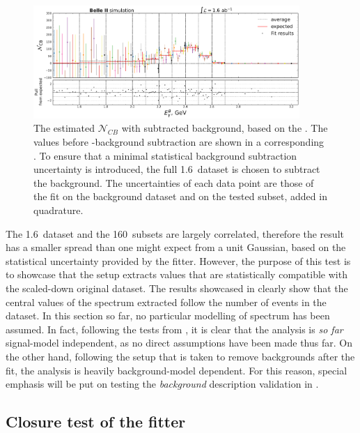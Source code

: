 \begin{figure}[htbp!]
    \includegraphics[width=0.9\textwidth]{figures/mc_validation/subtracted_signal_generic_mc.pdf}
    \caption{\label{fig:subtracted_validation_mc}
    The estimated $\mathcal{N}_{CB}$ with subtracted background, based on the .
    The values before \BB-background subtraction are shown in a corresponding .
    To ensure that a minimal statistical background subtraction uncertainty is introduced, the full 1.6~\invab dataset is chosen to subtract the background.
    The uncertainties of each data point are those of the \Mbc fit on the background dataset and on the tested subset, added in quadrature.
    }
\end{figure}

The 1.6~\invab dataset and the 160~\invfb subsets are largely correlated, therefore the result has a smaller spread than one might expect from a unit Gaussian, based on the statistical uncertainty provided by the fitter.
However, the purpose of this test is to showcase that the setup extracts values that are statistically compatible with the scaled-down original dataset.
The results showcased in  clearly show that the central values of the \EB spectrum extracted follow the number of \BtoXsgamma events in the dataset.
In this section so far, no particular modelling of \BtoXsgamma spectrum has been assumed.
In fact, following the tests from , it is clear that the analysis is \textit{so far} signal-model independent, as no direct assumptions have been made thus far.
On the other hand, following the setup that is taken to remove \BB backgrounds after the \Mbc fit, the analysis is heavily background-model dependent.
For this reason, special emphasis will be put on testing the \textit{background} description validation in .

\subsection{Closure test of the \texorpdfstring{\Mbc}{Mbc} fitter}\label{sec:closure_test}

